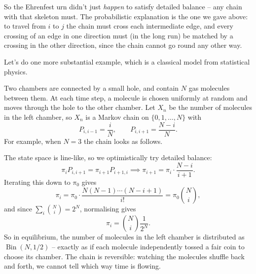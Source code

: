 So the Ehrenfest urn didn't just \emph{happen} to satisfy detailed balance -- any chain with that skeleton must. The probabilistic explanation is the one we gave above: to travel from $i$ to $j$ the chain must cross each intermediate edge, and every crossing of an edge in one direction must (in the long run) be matched by a crossing in the other direction, since the chain cannot go round any other way.

Let's do one more substantial example, which is a classical model from statistical physics.

\begin{example}
	Two chambers are connected by a small hole, and contain $N$ gas molecules between them. At each time step, a molecule is chosen uniformly at random and moves through the hole to the other chamber. Let $X_n$ be the number of molecules in the left chamber, so $X_n$ is a Markov chain on $\{0, 1, \dots, N\}$ with
	$$
	P_{i, i - 1} = \frac{i}{N}, \qquad P_{i, i + 1} = \frac{N - i}{N}.
	$$
	For example, when $N = 3$ the chain looks as follows.
	\begin{center}
	\end{center}
	The state space is line-like, so we optimistically try detailed balance:
	$$
	\pi_i P_{i, i + 1} = \pi_{i + 1}P_{i + 1, i} \implies \pi_{i + 1} = \pi_i \cdot \frac{N - i}{i + 1}.
	$$
	Iterating this down to $\pi_0$ gives
	$$
	\pi_i = \pi_0 \cdot \frac{N (N - 1) \cdots (N - i + 1)}{i!} = \pi_0 \binom{N}{i},
	$$
	and since $\sum_i \binom{N}{i} = 2^N$, normalising gives
	$$
	\pi_i = \binom{N}{i} \frac{1}{2^N}.
	$$
	So in equilibrium, the number of molecules in the left chamber is distributed as $\operatorname{Bin}(N, 1/2)$ -- exactly as if each molecule independently tossed a fair coin to choose its chamber. The chain is reversible: watching the molecules shuffle back and forth, we cannot tell which way time is flowing.


\end{example}
